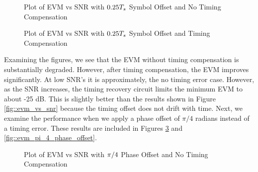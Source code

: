 \documentclass{article}
\begin{document}
\begin{figure}[H]
	\centerline{}
	\caption{Plot of EVM vs SNR with $\protect{0.25T_s}$ Symbol Offset and No Timing Compensation}
	\label{fig::evm_0p25_symbol_offset_no_comp}
\end{figure}

\begin{figure}[H]
	\centerline{}
	\caption{Plot of EVM vs SNR with $\protect{0.25T_s}$ Symbol Offset and Timing Compensation}
	\label{fig::evm_0p25_symbol_offset}
\end{figure}

Examining the figures, we see that the EVM without timing compensation is substantially degraded. However, after timing compensation, the EVM improves significantly. At low SNR's it is approximately, the no timing error case. However, as the SNR increases, the timing recovery circuit limits the minimum EVM to about -25 dB. This is slightly better than the results shown in Figure \ref{fig::evm_vs_snr} because the timing offset does not drift with time. Next, we examine the performance when we apply a phase offset of $\pi/4$ radians instead of a timing error. These results are included in Figures \ref{fig::evm_pi_4_phase_offset_no_comp} and \ref{fig::evm_pi_4_phase_offset}.

\begin{figure}[H]
	\centerline{}
	\caption{Plot of EVM vs SNR with $\protect\pi/4$ Phase Offset and No Timing Compensation}
	\label{fig::evm_pi_4_phase_offset_no_comp}
\end{figure}
\end{document}
